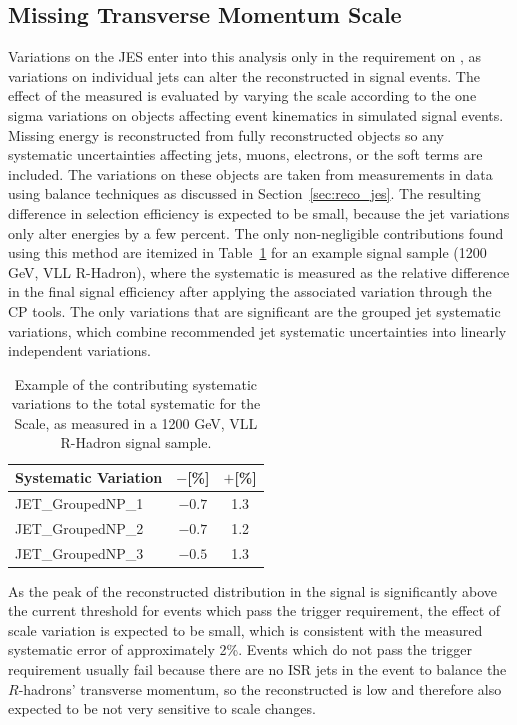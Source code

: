 \subsection{Missing Transverse Momentum Scale}

Variations on the \ac{JES} enter into this analysis only in the requirement on \met, as variations on individual jets can alter the reconstructed \met in signal events. The effect of the measured \met is evaluated by varying the \met scale according to the one sigma variations on objects affecting event kinematics in simulated signal events. Missing energy is reconstructed from fully reconstructed objects so any systematic uncertainties affecting jets, muons, electrons, or the \met soft terms are included. The variations on these objects are taken from measurements in data using balance techniques as discussed in Section~\ref{sec:reco_jes}. The resulting difference in selection efficiency is expected to be small, because the jet variations only alter energies by a few percent. The only non-negligible contributions found using this method are itemized in Table~\ref{tab:met_syst_contributions} for an example signal sample (1200 GeV, \ac{VLL} R-Hadron), where the systematic is measured as the relative difference in the final signal efficiency after applying the associated variation through the CP tools. The only variations that are significant are the grouped jet systematic variations, which combine recommended jet systematic uncertainties into linearly independent variations. 

\begin{table}
  \begin{center}
  \begin{tabular}{lcc}
  \hline
  Systematic Variation & $-$[\%]& $+$[\%] \\
  \hline
  JET\_GroupedNP\_1 & $-0.7$ & 1.3\\
  JET\_GroupedNP\_2 & $-0.7$ & 1.2\\
  JET\_GroupedNP\_3 & $-0.5$ & 1.3\\
  \hline
  \end{tabular}
  \end{center}
  \caption{Example of the contributing systematic variations to the total systematic for the \met Scale, as measured in a 1200 GeV, \ac{VLL} R-Hadron signal sample.}
  \label{tab:met_syst_contributions}
\end{table}

As the peak of the reconstructed \met distribution in the signal is significantly above the current threshold for events which pass the trigger requirement, the effect of scale variation is expected to be small, which is consistent with the measured systematic error of approximately 2\%. Events which do not pass the trigger requirement usually fail because there are no ISR jets in the event to balance the $R$-hadrons' transverse momentum, so the reconstructed \met is low and therefore also expected to be not very sensitive to scale changes.

